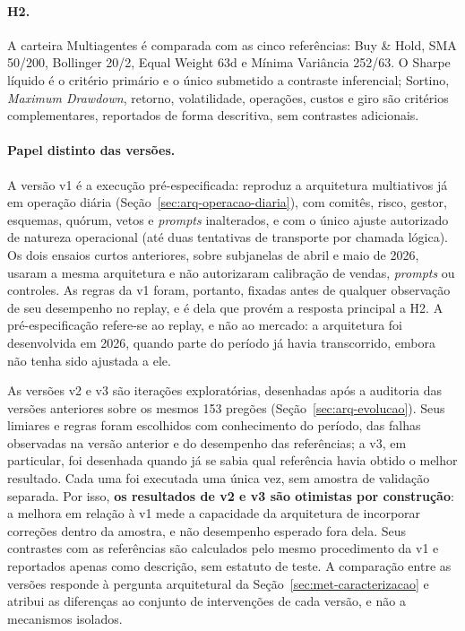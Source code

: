 \documentclass{eic-bcc-tcc}
\begin{document}
\paragraph{H2.} A carteira Multiagentes é comparada com as cinco referências: Buy \& Hold, SMA 50/200, Bollinger 20/2, Equal Weight 63d e Mínima Variância 252/63. O Sharpe líquido é o critério primário e o único submetido a contraste inferencial; Sortino, \textit{Maximum Drawdown}, retorno, volatilidade, operações, custos e giro são critérios complementares, reportados de forma descritiva, sem contrastes adicionais.

\paragraph{Papel distinto das versões.} A versão v1 é a execução pré-especificada: reproduz a arquitetura multiativos já em operação diária (Seção~\ref{sec:arq-operacao-diaria}), com comitês, risco, gestor, esquemas, quórum, vetos e \textit{prompts} inalterados, e com o único ajuste autorizado de natureza operacional (até duas tentativas de transporte por chamada lógica). Os dois ensaios curtos anteriores, sobre subjanelas de abril e maio de 2026, usaram a mesma arquitetura e não autorizaram calibração de vendas, \textit{prompts} ou controles. As regras da v1 foram, portanto, fixadas antes de qualquer observação de seu desempenho no replay, e é dela que provém a resposta principal a H2. A pré-especificação refere-se ao replay, e não ao mercado: a arquitetura foi desenvolvida em 2026, quando parte do período já havia transcorrido, embora não tenha sido ajustada a ele.

As versões v2 e v3 são iterações exploratórias, desenhadas após a auditoria das versões anteriores sobre os mesmos 153 pregões (Seção~\ref{sec:arq-evolucao}). Seus limiares e regras foram escolhidos com conhecimento do período, das falhas observadas na versão anterior e do desempenho das referências; a v3, em particular, foi desenhada quando já se sabia qual referência havia obtido o melhor resultado. Cada uma foi executada uma única vez, sem amostra de validação separada. Por isso, \textbf{os resultados de v2 e v3 são otimistas por construção}: a melhora em relação à v1 mede a capacidade da arquitetura de incorporar correções dentro da amostra, e não desempenho esperado fora dela. Seus contrastes com as referências são calculados pelo mesmo procedimento da v1 e reportados apenas como descrição, sem estatuto de teste. A comparação entre as versões responde à pergunta arquitetural da Seção~\ref{sec:met-caracterizacao} e atribui as diferenças ao conjunto de intervenções de cada versão, e não a mecanismos isolados.
\end{document}
